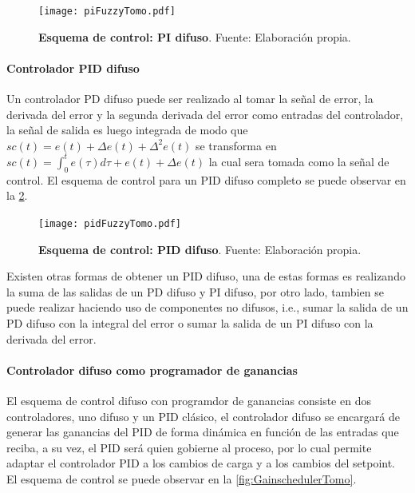                 \begin{figure}[htb]
                    \centering
                    \texttt{[image: piFuzzyTomo.pdf]}
                    \caption[Esquema de control: PI difuso]{\textbf{Esquema de control: PI difuso}. Fuente: Elaboración propia.} 
                    \label{fig:piFuzzyTomo}
                \end{figure}

                \pagebreak

            \paragraph{Controlador PID difuso}
                
                Un controlador PD difuso puede ser realizado al tomar la señal de error, la derivada del error y la segunda derivada del error como entradas del controlador, la señal de salida es luego integrada de modo que $sc(t) = e(t) + \Delta e(t) + \Delta^2 e(t)$ se transforma en $sc(t) = \int_0^t e(\tau)d\tau + e(t) + \Delta e(t)$ la cual sera tomada como la señal de control. El esquema de control para un PID difuso completo se puede observar en la \cref{fig:pidFuzzyTomo}.

                \begin{figure}[htb]
                    \centering
                    \texttt{[image: pidFuzzyTomo.pdf]}
                    \caption[Esquema de control: PID difuso]{\textbf{Esquema de control: PID difuso}. Fuente: Elaboración propia.} 
                    \label{fig:pidFuzzyTomo}
                \end{figure}

                Existen otras formas de obtener un PID difuso, una de estas formas es realizando la suma de las salidas de un PD difuso y PI difuso, por otro lado, tambien se puede realizar haciendo uso de componentes no difusos, i.e., sumar la salida de un PD difuso con la integral del error o sumar la salida de un PI difuso con la derivada del error.

            \paragraph{Controlador difuso como programador de ganancias}
                
                El esquema de control difuso con programdor de ganancias consiste en dos controladores, uno difuso y un PID clásico, el controlador difuso se encargará de generar las ganancias del PID de forma dinámica en función de las entradas que reciba, a su vez, el PID será quien gobierne al proceso, por lo cual permite adaptar el controlador PID a los cambios de carga y a los cambios del setpoint. El esquema de control se puede observar en la \cref{fig:GainschedulerTomo}.

